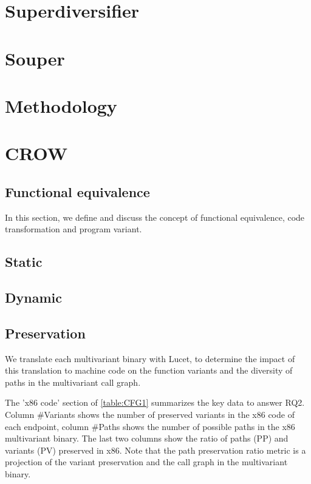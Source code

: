 \section{Superdiversifier}

\section{Souper}

\section{Methodology}

\section{CROW}

\subsection{Functional equivalence}

In this section, we define and discuss the concept of functional equivalence, code transformation and program variant.



\subsection{Static}
\subsection{Dynamic}
\subsection{Preservation}

We translate each \wasm multivariant binary with Lucet, to determine the impact of this translation to machine code on the function variants and the diversity of paths in the multivariant call graph. 

The 'x86 code' section of \autoref{table:CFG1} summarizes the key data to answer RQ2. Column \#Variants shows the number of preserved variants in the x86 code of each endpoint, column \#Paths shows the number of possible paths in the x86 multivariant binary. The last two columns show  the ratio of paths (PP) and variants (PV) preserved in x86. 
Note that the path preservation ratio metric is a projection of the variant preservation and the call graph in the multivariant binary.


